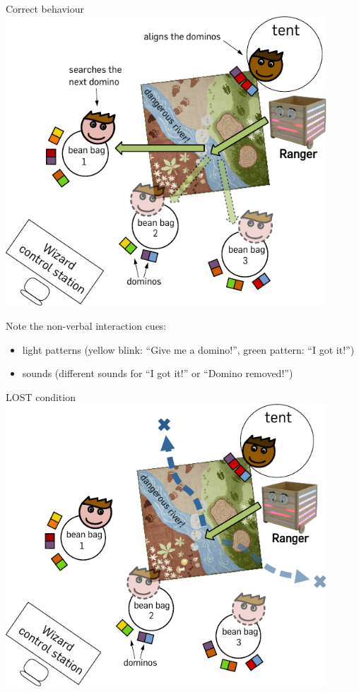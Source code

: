 \documentclass[compress]{beamer}
\begin{document}
\begin{frame}{Correct behaviour}
     {
    \centering
        \includegraphics[width=0.9\textwidth]{domino-setup}
    }
     {
    \centering
    }
     {
        Note the non-verbal interaction cues:
        \begin{itemize}
            \item light patterns (yellow blink: ``Give me a domino!'', green pattern:
                ``I got it!'')
            \item sounds (different sounds for ``I got it!'' or ``Domino removed!'')
        \end{itemize}
    }
\end{frame}

\begin{frame}{LOST condition}
    \centering
     {
        \includegraphics[width=0.9\textwidth]{domino-setup-lost}
    }
     {
    }

\end{frame}
\end{document}
